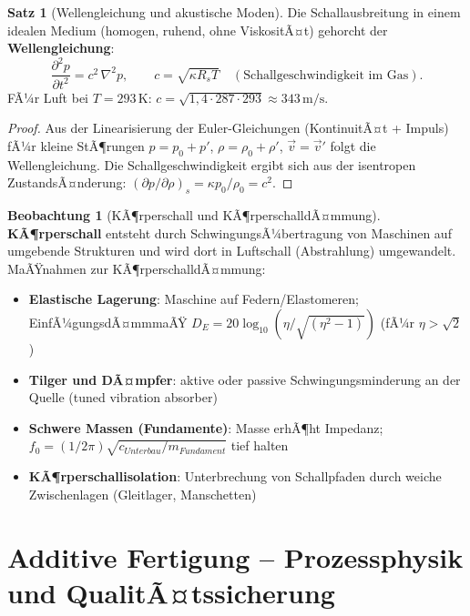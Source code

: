 ﻿\documentclass[a4paper,12pt]{report}
\theoremstyle{definition}
\newtheorem{satz}{Satz}
\newtheorem{beobachtung}{Beobachtung}
\begin{document}
\begin{satz}[Wellengleichung und akustische Moden]
Die Schallausbreitung in einem idealen Medium (homogen, ruhend, ohne ViskositÃ¤t)
gehorcht der \textbf{Wellengleichung}:
\[
  \frac{\partial^2 p}{\partial t^2} = c^2\,\nabla^2 p,
  \qquad c = \sqrt{\kappa R_s T} \quad (\text{Schallgeschwindigkeit im Gas}).
\]
FÃ¼r Luft bei $T = 293\,\mathrm{K}$: $c = \sqrt{1{,}4\cdot287\cdot293} \approx 343\,\mathrm{m/s}$.
\end{satz}
\begin{proof}
Aus der Linearisierung der Euler-Gleichungen (KontinuitÃ¤t + Impuls)
fÃ¼r kleine StÃ¶rungen $p = p_0 + p'$, $\rho = \rho_0 + \rho'$, $\vec{v} = \vec{v}'$
folgt die Wellengleichung. Die Schallgeschwindigkeit ergibt sich aus der
isentropen ZustandsÃ¤nderung: $(\partial p/\partial \rho)_s = \kappa p_0/\rho_0 = c^2$.
\end{proof}

\begin{beobachtung}[KÃ¶rperschall und KÃ¶rperschalldÃ¤mmung]
\textbf{KÃ¶rperschall} entsteht durch SchwingungsÃ¼bertragung von Maschinen
auf umgebende Strukturen und wird dort in Luftschall (Abstrahlung) umgewandelt.
MaÃŸnahmen zur KÃ¶rperschalldÃ¤mmung:
\begin{itemize}
    \item[-] \textbf{Elastische Lagerung}: Maschine auf Federn/Elastomeren;
          EinfÃ¼gungsdÃ¤mmmaÃŸ $D_E = 20\log_{10}(\eta/\sqrt{(\eta^2-1)})$ (fÃ¼r $\eta > \sqrt{2}$)
    \item[-] \textbf{Tilger und DÃ¤mpfer}: aktive oder passive Schwingungsminderung
          an der Quelle (tuned vibration absorber)
    \item[-] \textbf{Schwere Massen (Fundamente)}: Masse erhÃ¶ht Impedanz;
          $f_0 = (1/2\pi)\sqrt{c_{Unterbau}/m_{Fundament}}$ tief halten
    \item[-] \textbf{KÃ¶rperschallisolation}: Unterbrechung von Schallpfaden
          durch weiche Zwischenlagen (Gleitlager, Manschetten)
\end{itemize}
\end{beobachtung}

\section{Additive Fertigung -- Prozessphysik und QualitÃ¤tssicherung}
\end{document}
